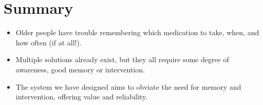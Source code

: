 \documentclass{article}
\begin{document}
\section{Summary}
	\begin{itemize}	
	\item Older people have trouble remembering which medication to take, when, and how often (if at all!).
	\item Multiple solutions already exist, but they all require some degree of awareness, good memory or intervention.
	\item The system we have designed aims to obviate the need for memory and intervention, offering value and reliability.
	\end{itemize}
\end{document}

